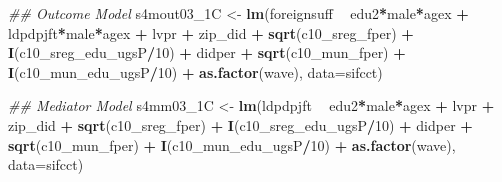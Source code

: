 \documentclass[
]{article}
\newenvironment{Shaded}{\begin{snugshade}}{\end{snugshade}}
\newcommand{\CommentTok}[1]{\textcolor[rgb]{0.56,0.35,0.01}{\textit{#1}}}
\newcommand{\DataTypeTok}[1]{\textcolor[rgb]{0.13,0.29,0.53}{#1}}
\newcommand{\DecValTok}[1]{\textcolor[rgb]{0.00,0.00,0.81}{#1}}
\newcommand{\KeywordTok}[1]{\textcolor[rgb]{0.13,0.29,0.53}{\textbf{#1}}}
\newcommand{\NormalTok}[1]{#1}
\newcommand{\OperatorTok}[1]{\textcolor[rgb]{0.81,0.36,0.00}{\textbf{#1}}}
\newcommand{\StringTok}[1]{\textcolor[rgb]{0.31,0.60,0.02}{#1}}
\begin{document}
\begin{Shaded}
\begin{Highlighting}[]
\CommentTok{## Outcome Model }
\NormalTok{s4mout03_1C <-}\StringTok{ }\KeywordTok{lm}\NormalTok{(foreignsuff  }\OperatorTok{~}\StringTok{ }\NormalTok{edu2}\OperatorTok{*}\NormalTok{male}\OperatorTok{*}\NormalTok{agex }\OperatorTok{+}\StringTok{ }\NormalTok{ldpdpjft}\OperatorTok{*}\NormalTok{male}\OperatorTok{*}\NormalTok{agex }\OperatorTok{+}\StringTok{ }\NormalTok{lvpr }\OperatorTok{+}\StringTok{  }
\StringTok{                    }\NormalTok{zip_did }\OperatorTok{+}\StringTok{ }\KeywordTok{sqrt}\NormalTok{(c10_sreg_fper) }\OperatorTok{+}\StringTok{ }\KeywordTok{I}\NormalTok{(c10_sreg_edu_ugsP}\OperatorTok{/}\DecValTok{10}\NormalTok{) }\OperatorTok{+}\StringTok{ }
\StringTok{                    }\NormalTok{didper }\OperatorTok{+}\StringTok{ }\KeywordTok{sqrt}\NormalTok{(c10_mun_fper) }\OperatorTok{+}\StringTok{ }\KeywordTok{I}\NormalTok{(c10_mun_edu_ugsP}\OperatorTok{/}\DecValTok{10}\NormalTok{) }\OperatorTok{+}\StringTok{ }
\StringTok{                    }\KeywordTok{as.factor}\NormalTok{(wave), }\DataTypeTok{data=}\NormalTok{sifcct)}

\CommentTok{## Mediator Model}
\NormalTok{s4mm03_1C <-}\StringTok{ }\KeywordTok{lm}\NormalTok{(ldpdpjft }\OperatorTok{~}\StringTok{ }\NormalTok{edu2}\OperatorTok{*}\NormalTok{male}\OperatorTok{*}\NormalTok{agex }\OperatorTok{+}\StringTok{ }\NormalTok{lvpr }\OperatorTok{+}\StringTok{  }
\StringTok{                  }\NormalTok{zip_did }\OperatorTok{+}\StringTok{ }\KeywordTok{sqrt}\NormalTok{(c10_sreg_fper) }\OperatorTok{+}\StringTok{ }\KeywordTok{I}\NormalTok{(c10_sreg_edu_ugsP}\OperatorTok{/}\DecValTok{10}\NormalTok{) }\OperatorTok{+}\StringTok{ }
\StringTok{                  }\NormalTok{didper }\OperatorTok{+}\StringTok{ }\KeywordTok{sqrt}\NormalTok{(c10_mun_fper) }\OperatorTok{+}\StringTok{ }\KeywordTok{I}\NormalTok{(c10_mun_edu_ugsP}\OperatorTok{/}\DecValTok{10}\NormalTok{) }\OperatorTok{+}\StringTok{ }
\StringTok{                  }\KeywordTok{as.factor}\NormalTok{(wave), }\DataTypeTok{data=}\NormalTok{sifcct)}


\end{Highlighting}
\end{Shaded}
\end{document}
